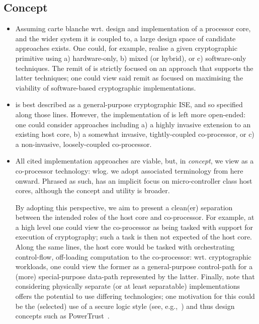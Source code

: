 
\subsection{Concept}
\label{sec:bg:concept}

\begin{itemize}

\item Assuming carte blanche wrt. design and implementation of a processor 
      core, and the wider system it is coupled to, a large design space of 
      candidate approaches exists.  One could, for example, realise a given 
      cryptographic primitive using
      a) hardware-only,
      b) mixed (or hybrid),
         or
      c) software-only
      techniques.
      The remit of \XCID is strictly focused on an approach that supports the
      latter techniques; one could view said remit as focused on maximising
      the viability of software-based cryptographic implementations.

\item \XCID is best described as a general-purpose cryptographic ISE, and so
      specified along those lines.  However, the implementation of \XCID is
      left more open-ended: one could consider approaches including
      a) a highly   invasive extension to an existing host core,
      b) a somewhat invasive, tightly-coupled co-processor,
         or
      c) a      non-invasive, loosely-coupled co-processor.

\item All cited implementation approaches are viable, but, in {\em concept},
      we view \XCID as a co-processor technology: wlog. we adopt associated
      terminology from here onward.  Phrased as such, \XCID has an implicit
      focus on micro-controller class host cores, although the concept and 
      utility is broader.

      By adopting this perspective, we aim to present a clean(er) separation 
      between the intended roles of the host core and \XCID co-processor.
      For example, at a high level one could view the co-processor as being 
      tasked with support for execution of cryptography; such a task is then
      not expected of the host core.  Along the same lines, the host core 
      would be tasked with orchestrating control-flow, off-loading computation 
      to the co-processor: wrt. cryptographic workloads, one could view the
      former as a general-purpose control-path for a (more) special-purpose 
      data-path represented by the latter.  Finally, note that considering
      physically separate (or at least separatable) implementations offers
      the potential to use differing technologies; one motivation for this 
      could be the (selected) use of a secure logic style 
      (see, e.g.,~\cite{SCARV:MayMur:16})
      and thus design concepts such as PowerTrust~\cite{SCARV:TilKirSze:10}.


\end{itemize}
